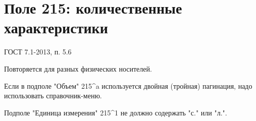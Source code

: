 \chapter*{Поле 215: количественные характеристики}

ГОСТ 7.1-2013, п. 5.6

Повторяется для разных физических носителей.

Если в подполе "Объем" 215\^{}a используется двойная (тройная) пагинация, надо использовать справочник-меню.

Подполе "Единица измерения" 215\^{}1 не должно содержать "с." или "л.".
